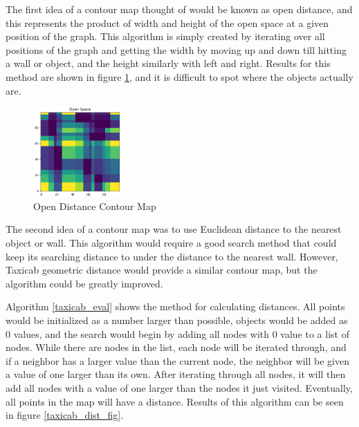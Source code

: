 \documentclass[sigconf,authordraft]{acmart}
\begin{document}
    The first idea of a contour map thought of would be known as open distance, and this represents the product of width and height of the open space at a given position of the graph. This algorithm is simply created by iterating over all positions of the graph and getting the width by moving up and down till hitting a wall or object, and the height similarly with left and right. Results for this method are shown in figure \ref{open_dist_fig}, and it is difficult to spot where the objects actually are. 
    \begin{figure}
        \centering
        \includegraphics[width=0.3\textwidth]{contour_map_opendist.png}
        \caption{Open Distance Contour Map}
        \label{open_dist_fig}
    \end{figure}

    The second idea of a contour map was to use Euclidean distance to the nearest object or wall. This algorithm would require a good search method that could keep its searching distance to under the distance to the nearest wall. However, Taxicab geometric distance would provide a similar contour map, but the algorithm could be greatly improved. 

    Algorithm \ref{taxicab_eval} shows the method for calculating distances. All points would be initialized as a number larger than possible, objects would be added as 0 values, and the search would begin by adding all nodes with 0 value to a list of nodes. While there are nodes in the list, each node will be iterated through, and if a neighbor has a larger value than the current node, the neighbor will be given a value of one larger than its own. After iterating through all nodes, it will then add all nodes with a value of one larger than the nodes it just visited. Eventually, all points in the map will have a distance. Results of this algorithm can be seen in figure \ref{taxicab_dist_fig}.
\end{document}

